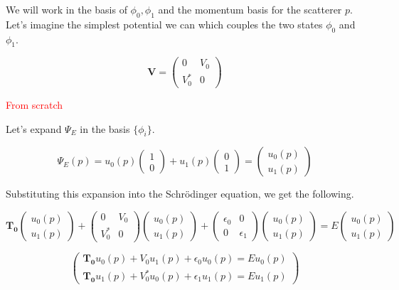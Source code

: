 \documentclass[12pt,letterpaper]{article}
\numberwithin{equation}{section}
\newcommand{\beq}{\begin{equation}}
\newcommand{\eeq}{\end{equation}}
\begin{document}
\noindent We will work in the basis of ${\phi_0,\phi_1}$ and the momentum basis for the scatterer $p$. Let's imagine the simplest potential we can which couples the two states $\phi_0$ and $\phi_1$.

\beq
\boldsymbol{V} =
\begin{pmatrix}
0 & V_0 \\ 
V_0^* & 0
\end{pmatrix}
\eeq

\textcolor{red}{From scratch}

\noindent Let's expand $\Psi_E$ in the basis $\{\phi_i\}$.

\beq
\Psi_E(p) = u_0(p)\begin{pmatrix}
1 \\ 0
\end{pmatrix}
+ u_1(p)\begin{pmatrix}
0 \\ 1
\end{pmatrix}
=
\begin{pmatrix}
u_0(p) \\ u_1(p)
\end{pmatrix}
\eeq

\noindent Substituting this expansion into the Schrödinger equation, we get the following.

\beq
\boldsymbol{T_0}
\begin{pmatrix}
u_0(p) \\ u_1(p)
\end{pmatrix}
+
\begin{pmatrix}
0 & V_0 \\ 
V_0^* & 0
\end{pmatrix}
\begin{pmatrix}
u_0(p) \\ u_1(p)
\end{pmatrix}
+
\begin{pmatrix}
\epsilon_0 & 0 \\ 
0 & \epsilon_1
\end{pmatrix}
\begin{pmatrix}
u_0(p) \\ u_1(p)
\end{pmatrix}
=
E
\begin{pmatrix}
u_0(p) \\ u_1(p)
\end{pmatrix}
\eeq

\beq
\begin{pmatrix}
\boldsymbol{T_0}u_0(p)+V_0u_1(p)+\epsilon_0u_0(p)=Eu_0(p) \\ 
\boldsymbol{T_0}u_1(p)+V_0^*u_0(p)+\epsilon_1u_1(p)=Eu_1(p)
\end{pmatrix}
\eeq
\end{document}
